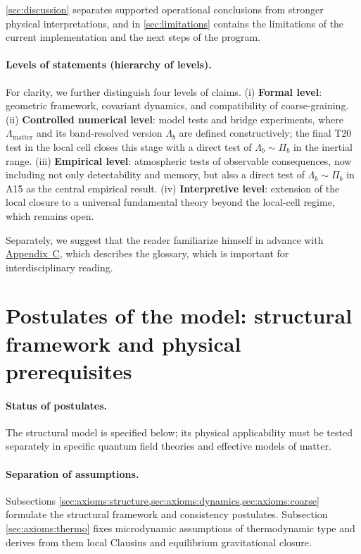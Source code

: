 \documentclass[11pt,a4paper]{article}
\theoremstyle{definition}
\theoremstyle{plain}
\theoremstyle{remark}
\begin{document}
\cref{sec:discussion} separates supported operational conclusions from stronger physical interpretations, and in \cref{sec:limitations} contains the limitations of the current implementation and the next steps of the program.

\paragraph{Levels of statements (hierarchy of levels).}
For clarity, we further distinguish four levels of claims. (i) \textbf{Formal level}: geometric framework, covariant dynamics, and compatibility of coarse-graining. (ii) \textbf{Controlled numerical level}: model tests and bridge experiments, where $\Lambda_{\mathrm{matter}}$ and its band-resolved version $\Lambda_b$ are defined constructively; the final T20 test in the local cell closes this stage with a direct test of $\Lambda_b\sim\Pi_b$ in the inertial range. (iii) \textbf{Empirical level}: atmospheric tests of observable consequences, now including not only detectability and memory, but also a direct test of $\Lambda_b\sim\Pi_b$ in A15 as the central empirical result. (iv) \textbf{Interpretive level}: extension of the local closure to a universal fundamental theory beyond the local-cell regime, which remains open.

Separately, we suggest that the reader familiarize himself in advance with \hyperref[sec:appendix:glossary]{Appendix~C}, which describes the glossary, which is important for interdisciplinary reading.

\section{Postulates of the model: structural framework and physical prerequisites}
\label{sec:axioms}

\paragraph{Status of postulates.}
The structural model is specified below; its physical applicability must be tested separately in specific quantum field theories and effective models of matter.

\paragraph{Separation of assumptions.}

Subsections \cref{sec:axioms:structure,sec:axioms:dynamics,sec:axioms:coarse} formulate the structural framework and consistency postulates.
Subsection \cref{sec:axioms:thermo} fixes microdynamic assumptions of thermodynamic type and derives from them
local Clausius and equilibrium gravitational closure.
\end{document}
